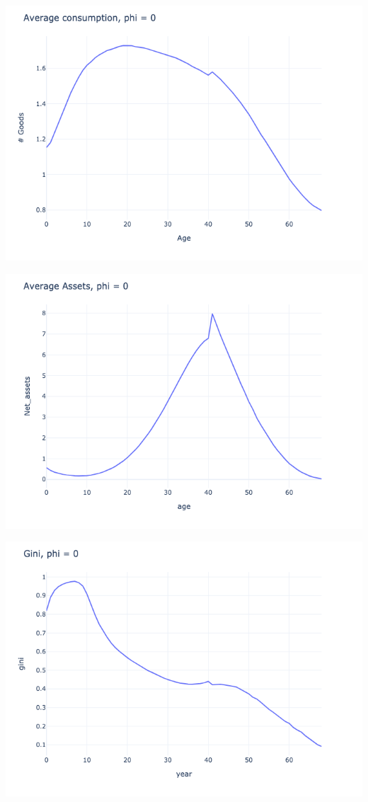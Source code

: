 \begin{questions}
\begin{solution}
	\includegraphics[scale=0.5]{figures/consumption_0_tax_30.png}

	\includegraphics[scale=0.5]{figures/avg_assets_0_tax_30.png}

	\includegraphics[scale=0.5]{figures/gini_0_tax_30.png}


\end{solution}
\end{questions}
